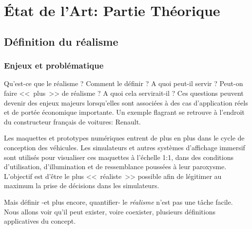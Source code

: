\part{État de l'Art: Partie Théorique}
\label{part:edla}

\chapter{Définition du réalisme}
\label{chap:def_realisme}
	\section{Enjeux et problématique}
	\par Qu'est-ce que le réalisme ? Comment le définir ? A quoi peut-il servir ? Peut-on faire <<~plus~>> de réalisme ? A quoi cela servirait-il ? Ces questions peuvent devenir des enjeux majeurs lorsqu'elles sont associées à des cas d'application réels et de portée économique importante. Un exemple flagrant se retrouve à l'endroit du constructeur français de voitures: Renault.
		
	\par Les maquettes et prototypes numériques entrent de plus en plus dans le cycle de conception des véhicules. Les simulateurs et autres systèmes d'affichage immersif sont utilisés pour visualiser ces maquettes à l'échelle 1:1, dans des conditions d'utilisation, d'illumination et de ressemblance poussées à leur paroxysme. L'objectif est d'être le plus <<~réaliste~>> possible afin de légitimer au maximum la prise de décisions dans les simulateurs.
	
	\par Mais définir -et plus encore, quantifier- le \textit{réalisme} n'est pas une tâche facile. Nous allons voir qu'il peut exister, voire coexister, plusieurs définitions applicatives du concept.
	
